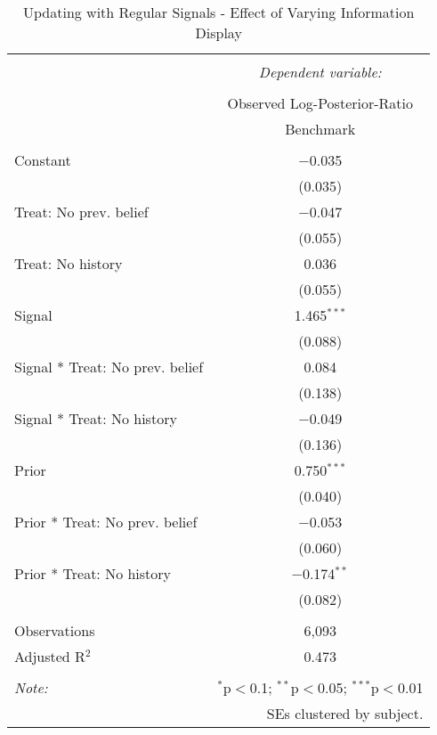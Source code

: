 
\begin{table}[!htbp] \centering \small
  \caption{Updating with Regular Signals - Effect of Varying Information Display} 
  \label{tab:regular_treat} 
\begin{tabular}{@{\extracolsep{5pt}}lc} 
\\[-1.8ex]\hline 
\hline \\[-1.8ex] 
 & \multicolumn{1}{c}{\textit{Dependent variable:}} \\ 
\cline{2-2} 
\\[-1.8ex] & Observed Log-Posterior-Ratio \\ 
 & Benchmark \\ 
\hline \\[-1.8ex] 
 Constant & $-$0.035 \\ 
  & (0.035) \\ 
  Treat: No prev. belief & $-$0.047 \\ 
  & (0.055) \\ 
  Treat: No history & 0.036 \\ 
  & (0.055) \\ 
  Signal & 1.465$^{***}$ \\ 
  & (0.088) \\ 
  Signal * Treat: No prev. belief & 0.084 \\ 
  & (0.138) \\ 
  Signal * Treat: No history & $-$0.049 \\ 
  & (0.136) \\ 
  Prior & 0.750$^{***}$ \\ 
  & (0.040) \\ 
  Prior * Treat: No prev. belief & $-$0.053 \\ 
  & (0.060) \\ 
  Prior * Treat: No history & $-$0.174$^{**}$ \\ 
  & (0.082) \\ 
 \hline \\[-1.8ex] 
Observations & 6,093 \\ 
Adjusted R$^{2}$ & 0.473 \\ 
\hline 
\hline \\[-1.8ex] 
\textit{Note:}  & \multicolumn{1}{r}{$^{*}$p$<$0.1; $^{**}$p$<$0.05; $^{***}$p$<$0.01} \\ 
 & \multicolumn{1}{r}{SEs clustered by subject.} \\ 
\end{tabular} 
\end{table} 
